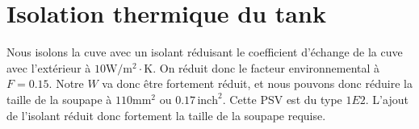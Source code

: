 \section{Isolation thermique du tank}
Nous isolons la cuve avec un isolant réduisant le coefficient d'échange de la cuve avec l'extérieur à 
$10 \si{\watt}/\si{\meter\squared} \cdot \si{\kelvin}$.
On réduit donc le facteur environnemental à $F = 0.15$. 
Notre $W$ va donc être fortement réduit, et nous pouvons donc réduire la taille de la soupape à 
$110\si{\milli\meter\squared}$ ou $0.17 \, \text{inch}^2$. 
Cette PSV est du type $1E2$. L'ajout de l'isolant réduit donc fortement la taille de
la soupape requise.

